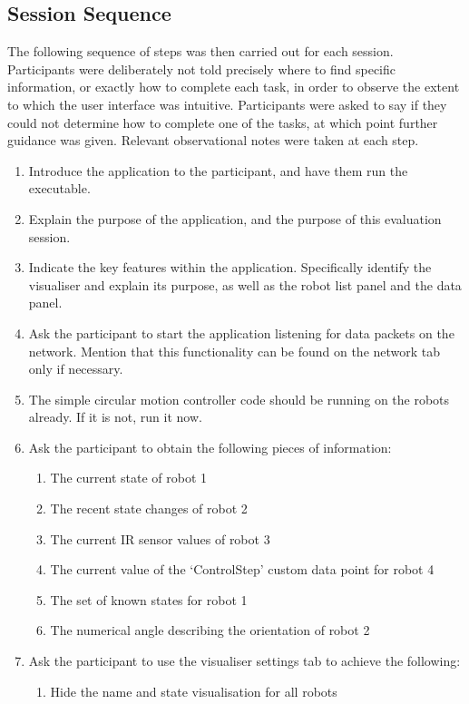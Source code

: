\subsection{Session Sequence}
The following sequence of steps was then carried out for each session. Participants were deliberately not told precisely where to find specific information, or exactly how to complete each task, in order to observe the extent to which the user interface was intuitive. Participants were asked to say if they could not determine how to complete one of the tasks, at which point further guidance was given. Relevant observational notes were taken at each step.

\begin{enumerate}
 \item Introduce the application to the participant, and have them run the executable.
 \item Explain the purpose of the application, and the purpose of this evaluation session.
 \item Indicate the key features within the application. Specifically identify the visualiser and explain its purpose, as well as the robot list panel and the data panel.
 \item Ask the participant to start the application listening for data packets on the network. Mention that this functionality can be found on the network tab only if necessary.
 \item The simple circular motion controller code should be running on the robots already. If it is not, run it now.
 \item Ask the participant to obtain the following pieces of information:
 \begin{enumerate}
  \item The current state of robot 1
  \item The recent state changes of robot 2
  \item The current IR sensor values of robot 3
  \item The current value of the `ControlStep' custom data point for robot 4
  \item The set of known states for robot 1
  \item The numerical angle describing the orientation of robot 2
 \end{enumerate}
 \item Ask the participant to use the visualiser settings tab to achieve the following:
 \begin{enumerate}
  \item Hide the name and state visualisation for all robots

\end{enumerate}
\end{enumerate}
